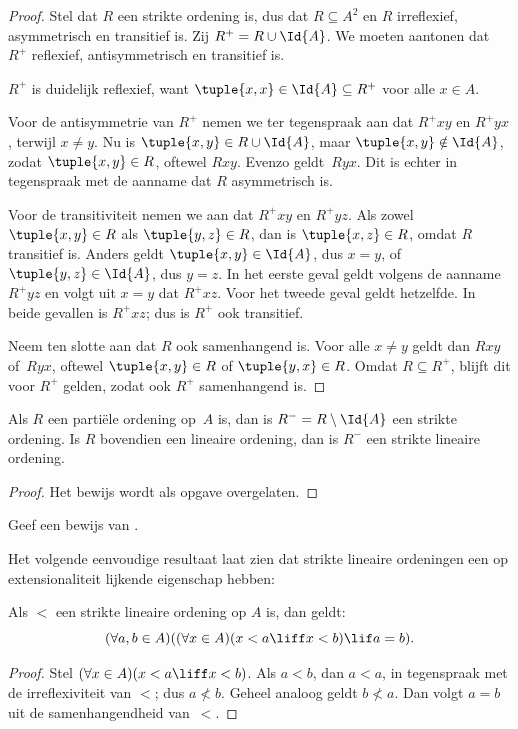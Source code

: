 \documentclass[../../../include/open-logic-section]{subfiles}
\begin{document}
\begin{proof}
Stel dat $R$ een strikte ordening is, dus dat $R \subseteq A^2$ en $R$
irreflexief, asymmetrisch en transitief is. Zij $R^+ = R \cup \Id{A}$. We
moeten aantonen dat $R^+$ reflexief, antisymmetrisch en transitief is.

$R^+$ is duidelijk reflexief, want $\tuple{x, x} \in \Id{A} \subseteq
R^+$ voor alle $x \in A$. 

Voor de antisymmetrie van $R^+$ nemen we ter tegenspraak aan dat
$R^+xy$ en $R^+yx$, terwijl $x \neq y$. Nu is $\tuple{x,y} \in R \cup \Id{A}$,
maar $\tuple{x, y} \notin \Id{A}$, zodat $\tuple{x, y} \in R$, oftewel
$Rxy$. Evenzo geldt~$Ryx$. Dit is echter in tegenspraak met de aanname
dat $R$ asymmetrisch is.

Voor de transitiviteit nemen we aan dat $R^+xy$ en $R^+yz$. Als zowel
$\tuple{x, y} \in R$ als $\tuple{y,z} \in R$, dan is $\tuple{x, z} \in
R$, omdat $R$ transitief is. Anders geldt $\tuple{x, y} \in
\Id{A}$, dus $x = y$, of $\tuple{y, z} \in \Id{A}$, dus $y = z$.
In het eerste geval geldt volgens de aanname $R^+yz$ en volgt uit $x = y$ dat
$R^+xz$. Voor het tweede geval geldt hetzelfde. In beide gevallen is $R^+xz$;
dus is $R^+$ ook transitief.

Neem ten slotte aan dat $R$ ook samenhangend is.
Voor alle $x \neq y$ geldt dan $Rxy$ of~$Ryx$, oftewel
$\tuple{x, y} \in R$ of $\tuple{y, x} \in R$. Omdat $R \subseteq R^+$,
blijft dit voor $R^+$ gelden, zodat ook $R^+$ samenhangend is.
\end{proof}

\begin{prop}
Als $R$ een partiële ordening op~$A$ is, dan is $R^- = R \setminus \Id{A}$ een
strikte ordening. Is $R$ bovendien een lineaire ordening, dan is $R^-$ een
strikte lineaire ordening.
\end{prop}

\begin{proof}
Het bewijs wordt als opgave overgelaten.
\end{proof}

\begin{prob}
Geef een bewijs van . 
\end{prob}

Het volgende eenvoudige resultaat laat zien dat strikte lineaire ordeningen
een op extensionaliteit lijkende eigenschap hebben:

\begin{prop}
Als $<$ een strikte lineaire ordening op $A$ is, dan geldt:
\[
  (\forall a, b \in A)((\forall x \in A)(x < a \liff x < b) \lif a = b).
\]
\end{prop}

\begin{proof}
Stel $(\forall x \in A)(x < a \liff x < b)$. Als $a < b$, dan $a <
a$, in tegenspraak met de irreflexiviteit van $<$; dus $a \nless b$.
Geheel analoog geldt $b \nless a$. Dan volgt $a = b$ uit de samenhangendheid
van~$<$.
\end{proof}
\end{document}

